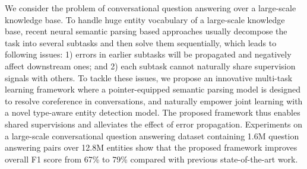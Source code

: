 We consider the problem of conversational question answering over a large-scale knowledge base. To handle huge entity vocabulary of a large-scale knowledge base, recent neural semantic parsing based approaches usually decompose the task into several subtasks and then solve them sequentially, which leads to following issues: 1) errors in earlier subtasks will be propagated and negatively affect downstream ones; and 2) each subtask cannot naturally share supervision signals with others. To tackle these issues, we propose an innovative multi-task learning framework where a pointer-equipped semantic parsing model is designed to resolve coreference in conversations, and naturally empower joint learning with a novel type-aware entity detection model. The proposed framework thus enables shared supervisions and alleviates the effect of error propagation. Experiments on a large-scale conversational question answering dataset containing 1.6M question answering pairs over 12.8M entities show that the proposed framework improves overall F1 score from 67\% to 79\% compared with previous state-of-the-art work.